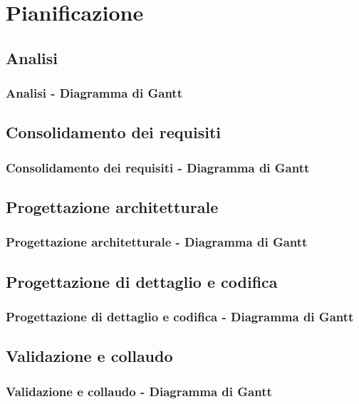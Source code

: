 \documentclass[PianoDiProgetto.tex]{subfiles}
\begin{document}
\chapter{Pianificazione}

\section{Analisi}
\subsection{Analisi - Diagramma di Gantt}

\section{Consolidamento dei requisiti}
\subsection{Consolidamento dei requisiti - Diagramma di Gantt}

\section{Progettazione architetturale}
\subsection{Progettazione architetturale - Diagramma di Gantt}

\section{Progettazione di dettaglio e codifica}
\subsection{Progettazione di dettaglio e codifica - Diagramma di Gantt}

\section{Validazione e collaudo}
\subsection{Validazione e collaudo - Diagramma di Gantt}
\end{document}
